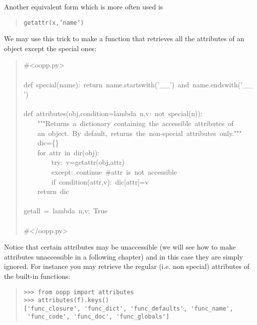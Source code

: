 \documentclass[10pt,english]{article}
\begin{document}
Another equivalent form which is more often used is
\begin{quote}

\texttt{getattr(x,'name')}
\end{quote}

We may use this trick to make a function that retrieves all the
attributes of an object except the special ones:
\begin{quote}
\begin{ttfamily}\begin{flushleft}
\mbox{{\#}<oopp.py>}\\
\mbox{}\\
\mbox{def~special(name):~return~name.startswith('{\_}{\_}')~and~name.endswith('{\_}{\_}')}\\
\mbox{}\\
\mbox{def~attributes(obj,condition=lambda~n,v:~not~special(n)):}\\
\mbox{~~~~"""Returns~a~dictionary~containing~the~accessible~attributes~of~}\\
\mbox{~~~~an~object.~By~default,~returns~the~non-special~attributes~only."""}\\
\mbox{~~~~dic={\{}{\}}}\\
\mbox{~~~~for~attr~in~dir(obj):}\\
\mbox{~~~~~~~~try:~v=getattr(obj,attr)}\\
\mbox{~~~~~~~~except:~continue~{\#}attr~is~not~accessible}\\
\mbox{~~~~~~~~if~condition(attr,v):~dic[attr]=v}\\
\mbox{~~~~return~dic}\\
\mbox{}\\
\mbox{getall~=~lambda~n,v:~True}\\
\mbox{}\\
\mbox{{\#}</oopp.py>}
\end{flushleft}\end{ttfamily}
\end{quote}

Notice that certain attributes may be unaccessible (we will see how
to make attributes unaccessible in a following chapter) 
and in this case they are simply ignored.
For instance you may retrieve the regular (i.e. non special)
attributes of the built-in functions:
\begin{quote}
\begin{verbatim}>>> from oopp import attributes
>>> attributes(f).keys()
['func_closure', 'func_dict', 'func_defaults', 'func_name', 
 'func_code', 'func_doc', 'func_globals']\end{verbatim}
\end{quote}
\end{document}
